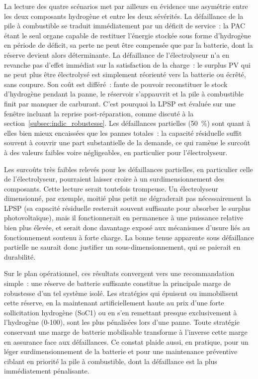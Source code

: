 La lecture des quatre scénarios met par ailleurs en évidence une asymétrie entre les deux composants hydrogène et entre les deux sévérités. La défaillance de la pile à combustible se traduit immédiatement par un déficit de service~: la PAC étant le seul organe capable de restituer l'énergie stockée sous forme d'hydrogène en période de déficit, sa perte ne peut être compensée que par la batterie, dont la réserve devient alors déterminante. La défaillance de l'électrolyseur n'a en revanche pas d'effet immédiat sur la satisfaction de la charge~: le surplus PV qui ne peut plus être électrolysé est simplement réorienté vers la batterie ou écrêté, sans coupure. Son coût est différé~: faute de pouvoir reconstituer le stock d'hydrogène pendant la panne, le réservoir s'appauvrit et la pile à combustible finit par manquer de carburant. C'est pourquoi la LPSP est évaluée sur une fenêtre incluant la reprise post-réparation, comme discuté à la section~\ref{subsec:indic_robustesse}. Les défaillances partielles (\SI{50}{\percent}) sont quant à elles bien mieux encaissées que les pannes totales~: la capacité résiduelle suffit souvent à couvrir une part substantielle de la demande, ce qui ramène le surcoût à des valeurs faibles voire négligeables, en particulier pour l'électrolyseur.

Les surcoûts très faibles relevés pour les défaillances partielles, en particulier celle de l'électrolyseur, pourraient laisser croire à un surdimensionnement des composants. Cette lecture serait toutefois trompeuse. Un électrolyseur dimensionné, par exemple, moitié plus petit ne dégraderait pas nécessairement la LPSP (sa capacité résiduelle resterait souvent suffisante pour absorber le surplus photovoltaïque), mais il fonctionnerait en permanence à une puissance relative bien plus élevée, et serait donc davantage exposé aux mécanismes d'usure liés au fonctionnement soutenu à forte charge. La bonne tenue apparente sous défaillance partielle ne saurait donc justifier un sous-dimensionnement, qui se paierait en durabilité.

Sur le plan opérationnel, ces résultats convergent vers une recommandation simple~: une réserve de batterie suffisante constitue la principale marge de robustesse d'un tel système isolé. Les stratégies qui épuisent ou immobilisent cette réserve, en la maintenant artificiellement haute au prix d'une forte sollicitation hydrogène (SoC1) ou en s'en remettant presque exclusivement à l'hydrogène (0-100), sont les plus pénalisées lors d'une panne. Toute stratégie conservant une marge de batterie mobilisable transforme à l'inverse cette marge en assurance face aux défaillances. Ce constat plaide aussi, en pratique, pour un léger surdimensionnement de la batterie et pour une maintenance préventive ciblant en priorité la pile à combustible, dont la défaillance est la plus immédiatement pénalisante.

